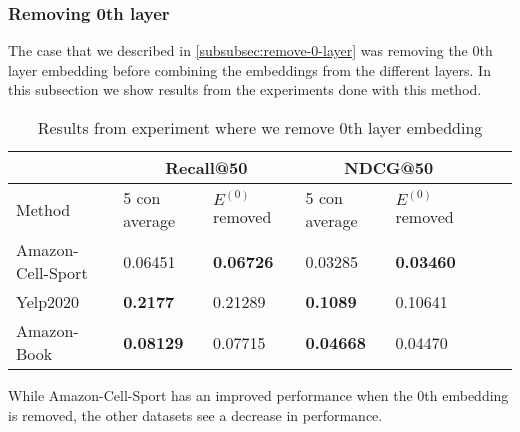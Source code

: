 \subsubsection{Removing 0th layer}
The case that we described in \autoref{subsubsec:remove-0-layer} was removing the 0th layer embedding before combining the embeddings from the different layers.
In this subsection we show results from the experiments done with this method.
\begin{table*}[h!]
    \centering
    \begin{tabular}{|l|l|l||l|l||l|l|}
        \hline
                            & \multicolumn{2}{c||}{Recall@50}           & \multicolumn{2}{c||}{NDCG@50}             \\ \hline
        Method              & 5 con average     & $E^{(0)}$ removed     & 5 con average       & $E^{(0)}$ removed   \\ \hline
        Amazon-Cell-Sport   & 0.06451           & \textbf{0.06726}      & 0.03285             & \textbf{0.03460}             \\ \hline
        Yelp2020            & \textbf{0.2177}   & 0.21289               & \textbf{0.1089}     & 0.10641            \\ \hline
        Amazon-Book         & \textbf{0.08129}  & 0.07715               & \textbf{0.04668}    & 0.04470            \\ \hline
    \end{tabular}
    \label{tab:removing-0th-layer-embedding-experiment}
    \caption{Results from experiment where we remove 0th layer embedding}
\end{table*}
While Amazon-Cell-Sport has an improved performance when the 0th embedding is removed, the other datasets see a decrease in performance.
